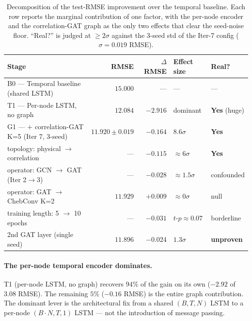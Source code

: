 \documentclass{article}
\begin{document}
\begin{table}[t]
\centering
\caption{Decomposition of the test-RMSE improvement over the temporal baseline. Each row reports the marginal contribution of one factor, with the per-node encoder and the correlation-GAT graph as the only two effects that clear the seed-noise floor. ``Real?'' is judged at $\geq 2\sigma$ against the 3-seed std of the Iter-7 config ($\sigma = 0.019$ RMSE).}
\label{tab:decomp}
\small
\setlength{\tabcolsep}{5pt}
\begin{tabular}{lrrll}
\toprule
\textbf{Stage} & \textbf{RMSE} & \textbf{$\Delta$ RMSE} & \textbf{Effect size} & \textbf{Real?} \\
\midrule
B0 --- Temporal baseline (shared LSTM)               & $15.000$           & ---       & ---                  & --- \\
T1 --- Per-node LSTM, no graph                       & $12.084$           & $-2.916$  & dominant             & \textbf{Yes} (huge) \\
G1 --- $+$ correlation-GAT K=5 (Iter 7, 3-seed)      & $11.920 \pm 0.019$ & $-0.164$  & $8.6\sigma$          & \textbf{Yes} \\
\quad topology: physical $\to$ correlation           & ---                & $-0.115$  & $\approx 6\sigma$    & \textbf{Yes} \\
\quad operator: GCN $\to$ GAT (Iter 2$\to$3)         & ---                & $-0.028$  & $\approx 1.5\sigma$  & confounded \\
\quad operator: GAT $\to$ ChebConv K=2               & $11.929$           & $+0.009$  & $\approx 0\sigma$    & null \\
\quad training length: 5 $\to$ 10 epochs             & ---                & $-0.031$  & $t$-$p \approx 0.07$ & borderline \\
\quad 2nd GAT layer (single seed)                    & $11.896$           & $-0.024$  & $1.3\sigma$          & \textbf{unproven} \\
\bottomrule
\end{tabular}
\end{table}

\paragraph{The per-node temporal encoder dominates.}
T1 (per-node LSTM, no graph) recovers $94\%$ of the gain on its own ($-2.92$ of $3.08$ RMSE). The remaining $5\%$ ($-0.16$ RMSE) is the entire graph contribution. The dominant lever is the architectural fix from a shared $(B, T, N)$ LSTM to a per-node $(B \cdot N, T, 1)$ LSTM --- not the introduction of message passing.
\end{document}
